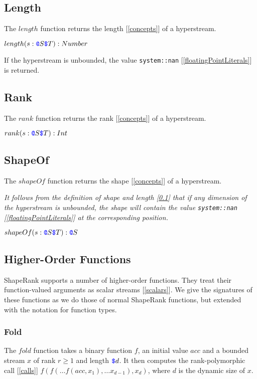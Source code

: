 \documentclass{article}
\begin{document}
\subsection{Length}
\label{length}

The $length$ function returns the length [\ref{concepts}] of a hyperstream.

$length(s: \texttt{\color{blue} @}{} S \texttt{\color{blue} \$}{} T): Number$

If the hyperstream is unbounded, the value {\tt system::nan} [\ref{floatingPointLiterals}] is returned.

\subsection{Rank}
\label{rank}

The $rank$ function returns the rank [\ref{concepts}] of a hyperstream.

$rank(s: \texttt{\color{blue} @}{} S \texttt{\color{blue} \$}{} T): Int$

\subsection{ShapeOf}
\label{shapeOf}

The $shapeOf$ function returns the shape [\ref{concepts}] of a hyperstream.

{\em 
It follows from the  definition of shape and length [\ref{length}] that
if any  dimension of the hyperstream is unbounded, the shape will contain the value {\tt system::nan} [\ref{floatingPointLiterals}] at the corresponding  position.
}

$shapeOf(s: \texttt{\color{blue} @}{} S \texttt{\color{blue} \$}{} T): \texttt{\color{blue} @}{} S$

\subsection{Higher-Order Functions}
\label{higherOrderFunctions}

ShapeRank supports a number of higher-order functions. They treat their function-valued arguments as scalar streams [\ref{scalars}]. We give the signatures of these functions as we do those of normal ShapeRank functions, but extended with the notation for function types.


\subsubsection{Fold}
\label{fold}


The $fold$ function takes a binary function $f$, an initial value $acc$ and a bounded stream $x$ of rank $r \ge 1$ and length $\texttt{\color{blue} \$}{}d$. It then computes the rank-polymorphic call [\ref{calls}]
$f(f( \ldots f(acc, x_1), \ldots x_{d-1}), x_d)$, where $d$ is the dynamic size of $x$.
\end{document}
